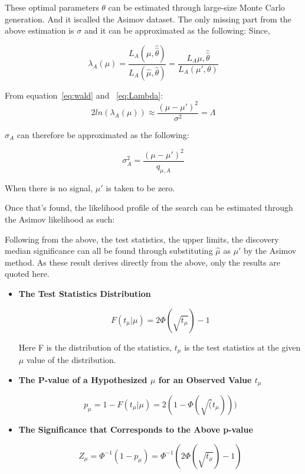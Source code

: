 These optimal parameters $\theta$ can be estimated through large-size Monte Carlo generation. And it iscalled the Asimov dataset.
The only missing part from the above estimation is $\sigma$ and it can be approximated as the following: 
Since, 

\begin{equation}
    \lambda_{A}(\mu) = \frac{L_{A}(\mu, \hat{\hat{\theta}})}{L_{A}(\hat{\mu}, \hat{\theta})}
= \frac{L_{A}{\mu, \hat{\hat{\theta}}}}{L_{A}(\mu', \theta)}
\end{equation}


From equation~\ref{eq:wald} and ~\ref{eq:Lambda}:
\begin{equation}
2ln(\lambda_{A}(\mu)) \approx \frac{(\mu-\mu')^{2}}{\sigma^{2}}=\Lambda
\end{equation}

$\sigma_{A}$ can therefore be approximated as the following:

\begin{equation}
    \sigma_{A}^{2} = \frac{(\mu-\mu')^{2}}{q_{\mu,A}}
\end{equation}

When there is no signal, $\mu'$ is taken to be zero. 


Once that's found, the likelihood profile of the search can be estimated through the Asimov likelihood as such:

Following from the above, the test statistics, the upper limits, the discovery median significance can all be found through substituting $\hat{\mu}$ as $\mu'$ by the Asimov method. As these result derives directly from the above, only the results are quoted here. 

\begin{itemize}
    \item \textbf{The Test Statistics Distribution}

\begin{equation}
    F(t_{\mu}| \mu) = 2\Phi(\sqrt{t_{\mu}})-1
\label{eq:teststatistics}
\end{equation}

Here F is the distribution of the statistics, $t_\mu$ is the test statistics at the given $\mu$ value of the distribution. 

\item \textbf{The P-value of a Hypothesized $\mu$ for an Observed Value $t_\mu$}

\begin{equation}
p_{\mu} = 1-F(t_{\mu}| \mu)=2(1-\Phi(\sqrt(t_{\mu})))
\end{equation}


\item \textbf{The Significance that Corresponds to the Above p-value}

\begin{equation}
Z_{\mu} = \Phi^{-1}(1-p_{\mu})  = \Phi^{-1}(2\Phi(\sqrt{t_{\mu}})-1)
\end{equation}

\end{itemize}

